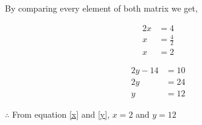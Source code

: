 \documentclass[12pt,twocolumn]{article}
\begin{document}
\noindent By comparing every element of both matrix we get,

\begin{equation}
\label{x}
\begin{split}
2x &= 4\\
x &= \frac{4}{2}\\
x &= 2
\end{split}
\end{equation}

\begin{equation}
\label{y}
\begin{split}
2y-14 &= 10\\
2y &= 24\\
y &= 12
\end{split}
\end{equation}


\noindent $ \therefore$ From equation \ref{x} and \ref{y},  $x = 2$ and $y=12 $
\end{document}
